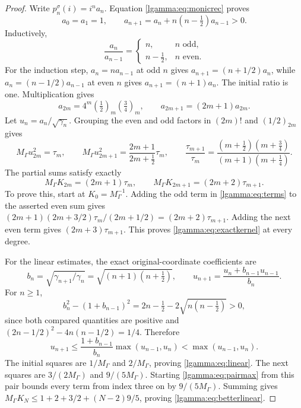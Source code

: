 \documentclass[11pt]{article}
\begin{document}
\begin{proof}
Write $p_n^\sigma(i)=i^na_n$.  Equation \eqref{lgamma:eq:monicrec} proves
\[
 a_0=a_1=1,\qquad
 a_{n+1}=a_n+n(n-\tfrac12)a_{n-1}>0.
\]
Inductively,
\begin{equation}\label{lgamma:eq:alternating}
 \frac{a_n}{a_{n-1}}=
 \begin{cases}n,&n\text{ odd},\\n-\tfrac12,&n\text{ even}.
 \end{cases}
\end{equation}
For the induction step, $a_n=na_{n-1}$ at odd $n$ gives
$a_{n+1}=(n+1/2)a_n$, while $a_n=(n-1/2)a_{n-1}$ at even $n$
gives $a_{n+1}=(n+1)a_n$.  The initial ratio is one.  Multiplication gives
\[
 a_{2m}=4^m(\tfrac12)_m(\tfrac34)_m,
 \qquad a_{2m+1}=(2m+1)a_{2m}.
\]
Let $u_n=a_n/\sqrt{\gamma_n}$.  Grouping the even and odd factors
in $(2m)!$ and $(1/2)_{2m}$ gives
\begin{equation}\label{lgamma:eq:terms}
 M_\Gamma u_{2m}^2=\tau_m,\qquad
 M_\Gamma u_{2m+1}^2=\frac{2m+1}{2m+\tfrac12}\tau_m,
 \qquad
 \frac{\tau_{m+1}}{\tau_m}
 =\frac{(m+\tfrac12)(m+\tfrac34)}{(m+1)(m+\tfrac14)}.
\end{equation}
The partial sums satisfy exactly
\[
 M_\Gamma K_{2m}=(2m+1)\tau_m,
 \qquad M_\Gamma K_{2m+1}=(2m+2)\tau_{m+1}.
\]
To prove this, start at $K_0=M_\Gamma^{-1}$.  Adding the odd term
in \eqref{lgamma:eq:terms} to the asserted even sum gives
$(2m+1)(2m+3/2)\tau_m/(2m+1/2)=(2m+2)\tau_{m+1}$.
Adding the next even term gives $(2m+3)\tau_{m+1}$.  This proves
\eqref{lgamma:eq:exactkernel} at every degree.

For the linear estimates, the exact original-coordinate coefficients are
\[
 b_n=\sqrt{\gamma_{n+1}/\gamma_n}=\sqrt{(n+1)(n+\tfrac12)},
 \qquad u_{n+1}=\frac{u_n+b_{n-1}u_{n-1}}{b_n}.
\]
For $n\ge1$,
\[
 b_n^2-(1+b_{n-1})^2
 =2n-\tfrac12-2\sqrt{n(n-\tfrac12)}>0,
\]
since both compared quantities are positive and
$(2n-1/2)^2-4n(n-1/2)=1/4$.  Therefore
\begin{equation}\label{lgamma:eq:pairmax}
 u_{n+1}\le\frac{1+b_{n-1}}{b_n}\max(u_{n-1},u_n)
 <\max(u_{n-1},u_n).
\end{equation}
The initial squares are $1/M_\Gamma$ and $2/M_\Gamma$, proving
\eqref{lgamma:eq:linear}.  The next squares are $3/(2M_\Gamma)$ and
$9/(5M_\Gamma)$.  Starting \eqref{lgamma:eq:pairmax} from this pair bounds
every term from index three on by $9/(5M_\Gamma)$.  Summing gives
$M_\Gamma K_N\le1+2+3/2+(N-2)9/5$, proving
\eqref{lgamma:eq:betterlinear}.
\end{proof}
\end{document}
